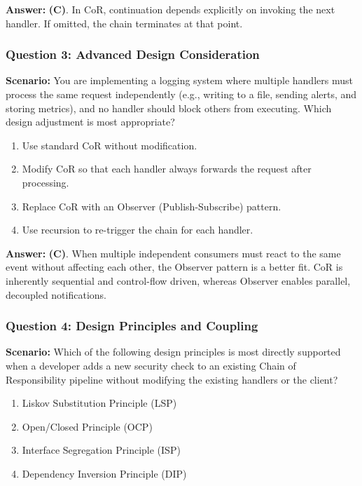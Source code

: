 \textbf{Answer:} \textbf{(C)}. In CoR, continuation depends explicitly on invoking the next handler. If omitted, the chain terminates at that point.

\subsubsection*{Question 3: Advanced Design Consideration}
\textbf{Scenario:} You are implementing a logging system where multiple handlers must process the same request independently (e.g., writing to a file, sending alerts, and storing metrics), and no handler should block others from executing. Which design adjustment is most appropriate?

\begin{enumerate}[label=(\Alph*)]
    \item Use standard CoR without modification.
    \item Modify CoR so that each handler always forwards the request after processing.
    \item Replace CoR with an Observer (Publish-Subscribe) pattern.
    \item Use recursion to re-trigger the chain for each handler.
\end{enumerate}

\textbf{Answer:} \textbf{(C)}. When multiple independent consumers must react to the same event without affecting each other, the Observer pattern is a better fit. CoR is inherently sequential and control-flow driven, whereas Observer enables parallel, decoupled notifications.

\subsubsection*{Question 4: Design Principles and Coupling}
\textbf{Scenario:} Which of the following design principles is most directly supported when a developer adds a new security check to an existing Chain of Responsibility pipeline without modifying the existing handlers or the client?

\begin{enumerate}[label=(\Alph*)]
    \item Liskov Substitution Principle (LSP)
    \item Open/Closed Principle (OCP)
    \item Interface Segregation Principle (ISP)
    \item Dependency Inversion Principle (DIP)
\end{enumerate}

